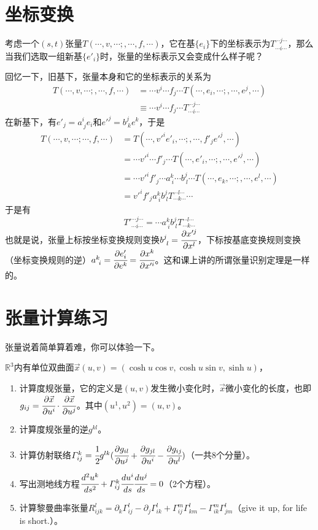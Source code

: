 \documentclass[a4paper,11pt]{ctexart}
\newcommand{\beq}{\begin{equation}}
\newcommand{\eeq}{\end{equation}}
\newcommand{\bea}{\begin{equation}\begin{aligned}}
\newcommand{\eea}{\end{aligned}\end{equation}}
\newcommand{\reals}{\mathbb{R}}
\begin{document}
\section{坐标变换}
考虑一个$(s,t)$张量$T(\cdots,v,\cdots;,\cdots,f,\cdots)$，它在基$\{e_i\}$下的坐标表示为$T_{\cdots i \cdots}^{\cdots j \cdots}$，那么当我们选取一组新基$\{e'_i\}$时，张量的坐标表示又会变成什么样子呢？
\par
回忆一下，旧基下，张量本身和它的坐标表示的关系为
\bea
T(\cdots,v,\cdots;,\cdots,f,\cdots) &= \cdots v^i \cdots  f_j \cdots T(\cdots,e_i,\cdots;,\cdots,e^j,\cdots) \\
&\equiv \cdots v^i \cdots  f_j \cdots T_{\cdots i \cdots}^{\cdots j \cdots}
\eea
在新基下，有$e'_j = a^i_{\ j} e_i$和$e'^j = b^j_{\ k} e^k$，于是
\bea
T(\cdots,v,\cdots;\cdots,f,\cdots) &= T(\cdots,v'^i e'_i,\cdots;,\cdots,f'_j e'^j,\cdots) \\
&= \cdots v'^i\cdots f'_j \cdots T(\cdots, e'_i,\cdots;,\cdots,e'^j,\cdots) \\
&= \cdots v'^i f'_j \cdots a^k_{\ i}\cdots b^j_{\ l}\cdots  T(\cdots, e_k,\cdots;,\cdots,e^l,\cdots) \\
&= v'^i f'_j  a^k_{\ i} b^j_{\ l} T_{\cdots k \cdots}^{\cdots l \cdots}\cdots
\eea
于是有
\beq
T'^{\cdots j \cdots}_{\cdots i \cdots} = \cdots a^k_{\ i} b^j_{\ l} T_{\cdots k \cdots}^{\cdots l \cdots}
\eeq
也就是说，张量上标按坐标变换规则变换$b^j_{\ l} = \cfrac{\partial x'^j}{\partial x^l}$，下标按基底变换规则变换（坐标变换规则的逆）$a^k_{\ i} = \cfrac{\partial e'_i}{\partial e^k} = \cfrac{\partial x^k}{\partial x'^i}$。这和课上讲的所谓张量识别定理是一样的。


\section{张量计算练习}
张量说着简单算着难，你可以体验一下。
\par
$\reals^3$内有单位双曲面$\vec{x}(u,v) = (\cosh u \cos v,\cosh u \sin v,\sinh u)$，
\begin{enumerate}
\item 计算度规张量，它的定义是$(u,v)$发生微小变化时，$\vec{x}$微小变化的长度，也即$g_{ij} = \cfrac{\partial \vec{x}}{\partial u^i} \cdot \cfrac{\partial \vec{x}}{\partial u^j}$。其中$(u^1,u^2) = (u,v)$。
\item 计算度规张量的逆$g^{kl}$。
\item 计算仿射联络$\varGamma_{ij}^k = \cfrac{1}{2} g^{lk}(\cfrac{\partial g_{il}}{\partial u^j} + \cfrac{\partial g_{jl}}{\partial u^i} - \cfrac{\partial g_{ij}}{\partial u^l})$（一共8个分量）。
\item 写出测地线方程$\cfrac{d^2 u^k}{ds^2} + \varGamma_{ij}^k \cfrac{du^i}{ds}\cfrac{du^j}{ds} = 0$（2个方程）。
\item 计算黎曼曲率张量$R_{ijk}^l = \partial_k \varGamma_{ij}^l -\partial_j \varGamma_{ik}^l + \varGamma_{ij}^m \varGamma_{km}^l - \varGamma_{ik}^m \varGamma_{jm}^l$（give it up, for life is short.）。
\end{enumerate}
\end{document}
